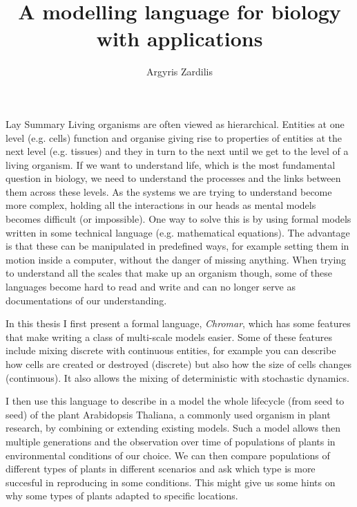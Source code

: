 \documentclass[phd, logo, twoside]{infthesis}
\title{A modelling language for biology with applications}
\author{Argyris Zardilis}
\newcommand{\eg}{e.g.\xspace}
\begin{document}
\begin{preliminary}

  \maketitle

  \begin{frontenv}{Lay Summary}{\LARGE}
    Living organisms are often viewed as hierarchical. Entities at one level
    (\eg cells) function and organise giving rise to properties of entities at
    the next level (\eg tissues) and they in turn to the next until we get to
    the level of a living organism. If we want to understand life, which is the
    most fundamental question in biology, we need to understand the processes
    and the links between them across these levels. As the systems we are trying
    to understand become more complex, holding all the interactions in our heads
    as mental models becomes difficult (or impossible). One way to solve this is
    by using formal models written in some technical language (\eg mathematical
    equations). The advantage is that these can be manipulated in predefined
    ways, for example setting them in motion inside a computer, without the
    danger of missing anything. When trying to understand all the scales that
    make up an organism though, some of these languages become hard to read and
    write and can no longer serve as documentations of our understanding.

    In this thesis I first present a formal language, \emph{Chromar}, which has
    some features that make writing a class of multi-scale models easier. Some
    of these features include mixing discrete with continuous entities, for
    example you can describe how cells are created or destroyed (discrete) but
    also how the size of cells changes (continuous). It also allows the
    mixing of deterministic with stochastic dynamics.

    I then use this language to describe in a model the whole lifecycle (from
    seed to seed) of the plant Arabidopsis Thaliana, a commonly used organism in
    plant research, by combining or extending existing models. Such a model
    allows then multiple generations and the observation over time of
    populations of plants in environmental conditions of our choice. We can then
    compare populations of different types of plants in different scenarios and
    ask which type is more succesful in reproducing in some conditions. This
    might give us some hints on why some types of plants adapted to specific
    locations.


\end{frontenv}
\end{preliminary}
\end{document}
